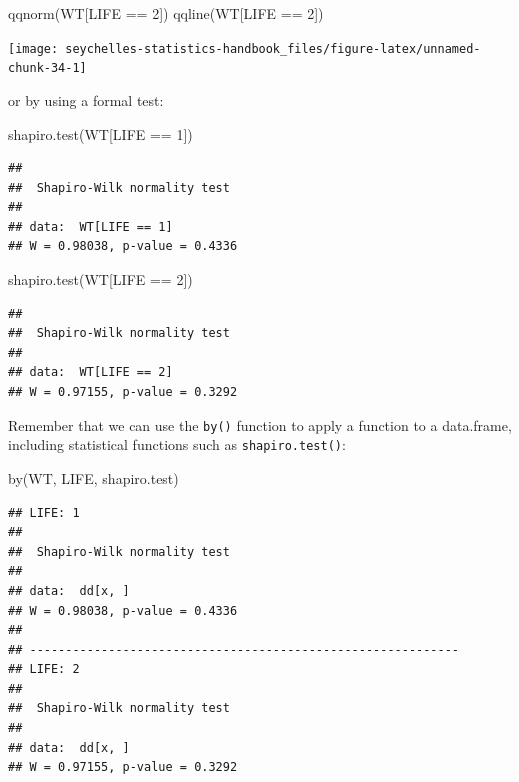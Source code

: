\documentclass[
  12pt,
]{book}
\newenvironment{Shaded}{\begin{snugshade}}{\end{snugshade}}
\newcommand{\DecValTok}[1]{\textcolor[rgb]{0.00,0.00,0.81}{#1}}
\newcommand{\FunctionTok}[1]{\textcolor[rgb]{0.00,0.00,0.00}{#1}}
\newcommand{\NormalTok}[1]{#1}
\newcommand{\SpecialCharTok}[1]{\textcolor[rgb]{0.00,0.00,0.00}{#1}}
\begin{document}
\begin{Shaded}
\begin{Highlighting}[]
\FunctionTok{qqnorm}\NormalTok{(WT[LIFE }\SpecialCharTok{==} \DecValTok{2}\NormalTok{])}
\FunctionTok{qqline}\NormalTok{(WT[LIFE }\SpecialCharTok{==} \DecValTok{2}\NormalTok{])}
\end{Highlighting}
\end{Shaded}

\begin{center}\texttt{[image: seychelles-statistics-handbook\_files/figure-latex/unnamed-chunk-34-1]} \end{center}

\newpage

or by using a formal test:

\begin{Shaded}
\begin{Highlighting}[]
\FunctionTok{shapiro.test}\NormalTok{(WT[LIFE }\SpecialCharTok{==} \DecValTok{1}\NormalTok{])}
\end{Highlighting}
\end{Shaded}

\begin{verbatim}
## 
##  Shapiro-Wilk normality test
## 
## data:  WT[LIFE == 1]
## W = 0.98038, p-value = 0.4336
\end{verbatim}

\begin{Shaded}
\begin{Highlighting}[]
\FunctionTok{shapiro.test}\NormalTok{(WT[LIFE }\SpecialCharTok{==} \DecValTok{2}\NormalTok{])}
\end{Highlighting}
\end{Shaded}

\begin{verbatim}
## 
##  Shapiro-Wilk normality test
## 
## data:  WT[LIFE == 2]
## W = 0.97155, p-value = 0.3292
\end{verbatim}

Remember that we can use the \texttt{by()} function to apply a function to a data.frame, including statistical functions such as \texttt{shapiro.test()}:

\begin{Shaded}
\begin{Highlighting}[]
\FunctionTok{by}\NormalTok{(WT, LIFE, shapiro.test)}
\end{Highlighting}
\end{Shaded}

\begin{verbatim}
## LIFE: 1
## 
##  Shapiro-Wilk normality test
## 
## data:  dd[x, ]
## W = 0.98038, p-value = 0.4336
## 
## ------------------------------------------------------------ 
## LIFE: 2
## 
##  Shapiro-Wilk normality test
## 
## data:  dd[x, ]
## W = 0.97155, p-value = 0.3292
\end{verbatim}
\end{document}
